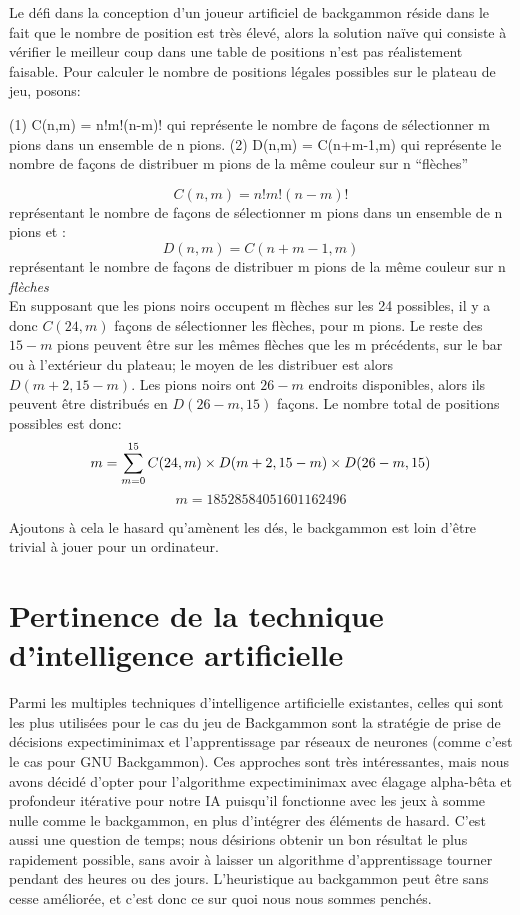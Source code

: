 \documentclass{article}
\begin{document}
Le défi dans la conception d’un joueur artificiel de backgammon réside dans le
fait que le nombre de position est très élevé, alors la solution naïve qui
consiste à vérifier le meilleur coup dans une table de positions n’est pas
réalistement faisable. Pour calculer le nombre de positions légales possibles
sur le plateau de jeu, posons:

(1)            C(n,m) = n!m!(n-m)!    qui représente le nombre de façons de
sélectionner m  pions dans un ensemble de n pions.
(2)   D(n,m) = C(n+m-1,m)     qui représente le nombre de façons de distribuer m
pions de la même couleur sur n “flèches”

\begin{equation}
    C(n,m) = n!m!(n-m)!
\end{equation}
représentant le nombre de façons de sélectionner m pions dans un ensemble de n
pions et :
\begin{equation}
    D(n,m) = C(n+m-1,m)
\end{equation}
représentant le nombre de façons de distribuer m pions de la même couleur sur n
\emph{flèches}\\

En supposant que les pions noirs occupent m flèches sur les 24 possibles, il y a
donc $ C(24,m) $ façons de sélectionner les flèches, pour m pions. Le reste des
$ 15-m $ pions peuvent être sur les mêmes flèches que les m précédents, sur le bar ou à
l’extérieur du plateau; le moyen de les distribuer est alors $ D(m+2,15-m) $. Les
pions noirs ont $ 26-m $ endroits disponibles, alors ils peuvent être distribués en
$ D(26-m,15) $ façons. Le nombre total de positions possibles est donc:
\begin{equation}
    m = \sum_{m=0}^{15}C(24,m) \times D(m+2, 15-m) \times D(26-m,15)\\
\end{equation}
\begin{equation}
    m = 18 528 584 051 601 162 496
\end{equation}

Ajoutons à cela le hasard qu’amènent les dés, le backgammon est loin d’être
trivial à jouer pour un ordinateur.

\section{Pertinence de la technique d'intelligence artificielle}
Parmi les multiples techniques d’intelligence artificielle existantes, celles qui
sont les plus utilisées pour le cas du jeu de Backgammon sont la stratégie de
prise de décisions expectiminimax et l’apprentissage par réseaux de neurones
(comme c’est le cas pour GNU Backgammon). Ces approches sont très intéressantes,
mais nous avons décidé d’opter pour l’algorithme expectiminimax avec élagage
alpha-bêta et profondeur itérative pour notre IA puisqu’il fonctionne avec les
jeux à somme nulle comme le backgammon, en plus d’intégrer des éléments de
hasard. C’est aussi une question de temps; nous désirions obtenir un bon
résultat le plus rapidement possible, sans avoir à laisser un algorithme
d’apprentissage tourner pendant des heures ou des jours. L’heuristique au
backgammon peut être sans cesse améliorée, et c’est donc ce sur quoi nous nous
sommes penchés. 
\end{document}
